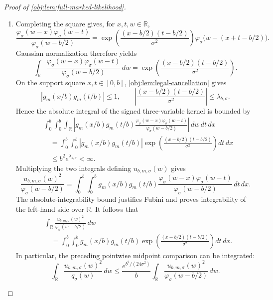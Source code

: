 \begin{proof}[Proof of \cref{obj:lem:full-marked-likelihood}]
\begin{enumerate}
\item Completing the square gives, for \(x,t,w\in\mathbb R\),
\[
\frac{\varphi_\sigma(w-x)\varphi_\sigma(w-t)}
     {\varphi_\sigma(w-b/2)}
=
\exp\!\left(\frac{(x-b/2)(t-b/2)}{\sigma^2}\right)
\varphi_\sigma\bigl(w-(x+t-b/2)\bigr).
\]
Gaussian normalization therefore yields
\[
\int_{\mathbb R}
\frac{\varphi_\sigma(w-x)\varphi_\sigma(w-t)}
     {\varphi_\sigma(w-b/2)}\,dw
=
\exp\!\left(\frac{(x-b/2)(t-b/2)}{\sigma^2}\right).
\]
On the support square \(x,t\in[0,b]\), \cref{obj:lem:legal-cancellation} gives
\[
|g_m(x/b)g_m(t/b)|\le1,
\qquad
\left|\frac{(x-b/2)(t-b/2)}{\sigma^2}\right|
\le\lambda_{b,\sigma}.
\]
Hence the absolute integral of the signed three-variable kernel is bounded by
\[
\begin{aligned}
&\int_0^b\int_0^b\int_{\mathbb R}
\left|
g_m(x/b)g_m(t/b)
\frac{\varphi_\sigma(w-x)\varphi_\sigma(w-t)}
     {\varphi_\sigma(w-b/2)}
\right|\,dw\,dt\,dx\\
&\quad=
\int_0^b\int_0^b
|g_m(x/b)g_m(t/b)|
\exp\!\left(\frac{(x-b/2)(t-b/2)}{\sigma^2}\right)dt\,dx\\
&\quad\le b^2e^{\lambda_{b,\sigma}}<\infty.
\end{aligned}
\]
Multiplying the two integrals defining \(u_{b,m,\sigma}(w)\) gives
\[
\frac{u_{b,m,\sigma}(w)^2}{\varphi_\sigma(w-b/2)}
=
\int_0^b\int_0^b
g_m(x/b)g_m(t/b)
\frac{\varphi_\sigma(w-x)\varphi_\sigma(w-t)}
     {\varphi_\sigma(w-b/2)}\,dt\,dx.
\]
The absolute-integrability bound justifies Fubini and proves integrability of the left-hand side over \(\mathbb R\). It follows that
\[
\begin{aligned}
&\int_{\mathbb R}
\frac{u_{b,m,\sigma}(w)^2}{\varphi_\sigma(w-b/2)}\,dw\\
&\quad=
\int_0^b\int_0^b
g_m(x/b)g_m(t/b)
\exp\!\left(\frac{(x-b/2)(t-b/2)}{\sigma^2}\right)dt\,dx.
\end{aligned}
\]
In particular, the preceding pointwise midpoint comparison can be integrated:
\[
\int_{\mathbb R}\frac{u_{b,m,\sigma}(w)^2}{q_\sigma(w)}\,dw
\le
\frac{e^{b^2/(24\sigma^2)}}b
\int_{\mathbb R}
\frac{u_{b,m,\sigma}(w)^2}{\varphi_\sigma(w-b/2)}\,dw.
\]


\end{enumerate}
\end{proof}
